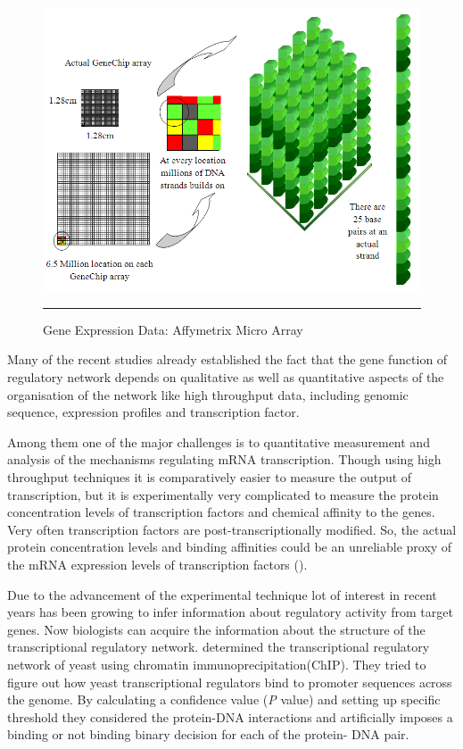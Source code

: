 \begin{figure}[t]
	\centering
		\includegraphics[width=\textwidth,keepaspectratio]{diagrams/GeneExpressionMicroarray.PNG}
		\rule{35em}{0.5pt}
	\caption{Gene Expression Data: Affymetrix Micro Array}
	\label{fig:Gene Expression Microarray}
\end{figure}

Many of the recent studies already established 
the fact that the gene function of regulatory network depends on qualitative as well as 
quantitative aspects of the organisation of the network like high throughput data, including 
genomic sequence, expression profiles and transcription factor.

Among them one of the major challenges is to quantitative measurement and analysis of the 
mechanisms regulating mRNA transcription. Though using high throughput techniques it is 
comparatively easier to measure the output of transcription, but it is experimentally 
very complicated to measure the protein concentration levels of transcription factors and 
chemical affinity to the genes. Very often transcription factors are post-transcriptionally modified. 
So, the actual protein concentration levels and binding affinities could be an unreliable proxy 
of the mRNA expression levels of transcription factors (\cite{Sanguinetti:2006}).

Due to the advancement of the experimental technique lot of interest in recent years has been 
growing to infer information about regulatory activity from target genes. Now biologists can 
acquire the information about the structure of the transcriptional regulatory network.  
\cite{Lee:2002} determined the transcriptional regulatory network of yeast using 
chromatin immunoprecipitation(ChIP). They tried to figure out how yeast transcriptional regulators 
bind to promoter sequences across the genome. By calculating a confidence value (\textit{P} value)
and setting up specific threshold they considered the protein-DNA interactions and artificially
imposes a binding or not binding binary decision for each of the protein- DNA pair.

